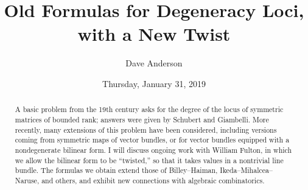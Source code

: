 \documentclass{UAmathtalk}
\author{Dave Anderson}
\title{Old Formulas for Degeneracy Loci,\\ with a New Twist}
\date{Thursday, January 31, 2019}
\begin{document}
\maketitle

\begin{abstract}
A basic problem from the 19th century asks for the degree of the locus of symmetric matrices of bounded rank; answers were given by Schubert and Giambelli.  More recently, many extensions of this problem have been considered, including versions coming from symmetric maps of vector bundles, or for vector bundles equipped with a nondegenerate bilinear form.  I will discuss ongoing work with William Fulton, in which we allow the bilinear form to be ``twisted,'' so that it takes values in a nontrivial line bundle.  The formulas we obtain extend those of Billey--Haiman, Ikeda--Mihalcea--Naruse, and others, and exhibit new connections with algebraic combinatorics.
\end{abstract}
\end{document}
